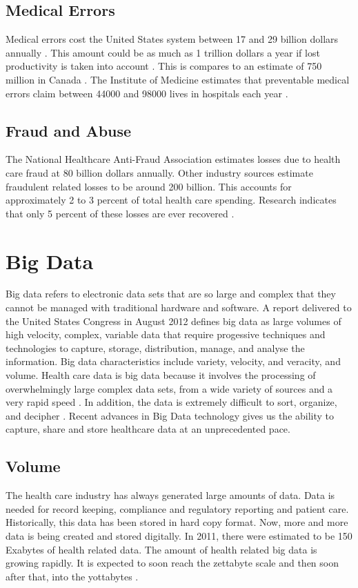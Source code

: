 \documentclass[sigconf]{acmart}
\begin{document}
\subsection{Medical Errors}
Medical errors cost the United States system between 17 and 29 billion dollars annually \cite{milbank}. This amount could be as much as 1 trillion dollars a year if lost productivity is taken into account \cite{www-google-pracfus}. This is compares to an estimate of 750 million in Canada \cite{milbank}.  The Institute of Medicine estimates that preventable medical errors claim between 44000 and 98000 lives in hospitals each year \cite{milbank}.

\subsection{Fraud and Abuse}
The National Healthcare Anti-Fraud Association estimates losses due to health care fraud at 80 billion dollars annually. Other industry sources estimate fraudulent related losses to be around 200 billion. This accounts for approximately 2 to 3 percent of total health care spending. Research indicates that only 5 percent of these losses are ever recovered \cite{www-google-datameer}.

\section{Big Data}

Big data refers to electronic data sets that are so large and complex that they cannot be managed with traditional hardware and software. A report delivered to the United States Congress in August 2012 defines big data as large volumes of high velocity, complex, variable data that require progessive techniques and technologies to capture, storage, distribution, manage, and analyse the information. Big data characteristics include variety, velocity, and veracity, and volume.  Health care data is big data because it involves the processing of overwhelmingly large complex data sets, from a wide variety of sources and a very rapid speed \cite{springer}.  In addition, the data is extremely difficult to sort, organize, and decipher \cite{www-google-digit}.  Recent advances in Big Data technology gives us the ability to capture, share and store healthcare data at an unprecedented pace.

\subsection{Volume}
The health care industry has always generated large amounts of data.  Data is needed for record keeping, compliance and regulatory reporting and patient care. Historically, this data has been stored in hard copy format. Now, more and more data is being created and stored digitally. In 2011, there were estimated to be 150 Exabytes of health related data. The amount of health related big data is growing rapidly. It is expected to soon reach the zettabyte scale and then soon after that, into the yottabytes \cite{springer}.
\end{document}
